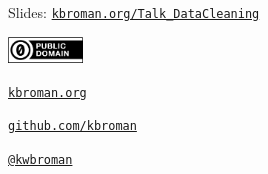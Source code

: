 \documentclass[aspectratio=169,12pt,t]{beamer}
\begin{document}
\begin{frame}[c]{}

\Large

Slides: \href{https://kbroman.org/Talk_DataCleaning}{\tt kbroman.org/Talk\_DataCleaning}

\vspace*{-7mm}
\hfill
\href{https://creativecommons.org/publicdomain/zero/1.0/}{\includegraphics[height=7mm]{Figs/cc-zero.png}}

\vspace{5mm}

\href{https://kbroman.org}{\tt \lolit kbroman.org}

\vspace{7mm}

\href{https://github.com/kbroman}{\tt \lolit github.com/kbroman}

\vspace{7mm}

\href{https://twitter.com/kwbroman}{\tt \lolit @kwbroman}


\end{frame}
\end{document}
